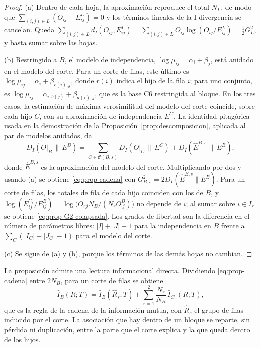 \begin{proof}
(a) Dentro de cada hoja, la aproximación reproduce el total $N_L$, de modo que
$\sum_{(i,j)\in L}(O_{ij}-E^{L}_{ij}) = 0$ y los términos lineales de la
I-divergencia se cancelan. Queda
$\sum_{(i,j)\in L} d_I(O_{ij},E^L_{ij}) = \sum_{(i,j)\in L} O_{ij}\log(O_{ij}/E^L_{ij}) = \tfrac12 G^2_L$,
y basta sumar sobre las hojas.

(b) Restringido a $B$, el modelo de independencia,
$\log\mu_{ij} = \alpha_i + \beta_j$, está anidado en el modelo del corte. Para
un corte de filas, este último es $\log\mu_{ij} = \alpha_i + \beta_{r(i),j}$,
donde $r(i)$ indica el hijo de la fila $i$; para uno conjunto, es
$\log\mu_{ij} = \alpha_{i,b(j)} + \beta_{a(i),j}$, que es la base C6 restringida
al bloque. En los tres casos, la estimación de máxima verosimilitud del modelo
del corte coincide, sobre cada hijo $C$, con su aproximación de independencia
$E^{C}$. La identidad pitagórica usada en la demostración de la
Proposición~\ref{prop:descomposicion}, aplicada al par de modelos anidados,
da
\[
  D_I(O|_B \,\|\, E^{B})
  = \sum_{C\in\mathcal{C}(B,s)} D_I(O|_C \,\|\, E^{C})
  + D_I(\hat E^{B,s} \,\|\, E^{B}),
\]
donde $\hat E^{B,s}$ es la aproximación del modelo del corte. Multiplicando por
dos y usando (a) se obtiene \eqref{eq:prop-cadena} con
$G^2_{B,s} = 2D_I(\hat E^{B,s}\|E^B)$. Para un corte de filas, los totales de
fila de cada hijo coinciden con los de $B$, y
$\log(E^{C_r}_{ij}/E^{B}_{ij}) = \log\bigl(O_{rj}N_B/(N_r O^B_{\cdot j})\bigr)$
no depende de $i$; al sumar sobre $i\in I_r$ se obtiene
\eqref{eq:prop-G2-colapsada}. Los grados de libertad son la diferencia en el
número de parámetros libres: $|I|+|J|-1$ para la independencia en $B$ frente a
$\sum_C(|I_C|+|J_C|-1)$ para el modelo del corte.

(c) Se sigue de (a) y (b), porque los términos de las demás hojas no cambian.
\end{proof}

La proposición admite una lectura informacional directa. Dividiendo
\eqref{eq:prop-cadena} entre $2N_B$, para un corte de filas se obtiene
\begin{equation}\label{eq:prop-regla-cadena}
  \hat I_B(R;T) = \hat I_B(\hat R_s;T)
  + \sum_{r=1}^{2}\frac{N_r}{N_B}\,\hat I_{C_r}(R;T),
\end{equation}
que es la regla de la cadena de la información mutua, con $\hat R_s$ el grupo de
filas inducido por el corte. La asociación que hay dentro de un bloque se
reparte, sin pérdida ni duplicación, entre la parte que el corte explica y la
que queda dentro de los hijos.

